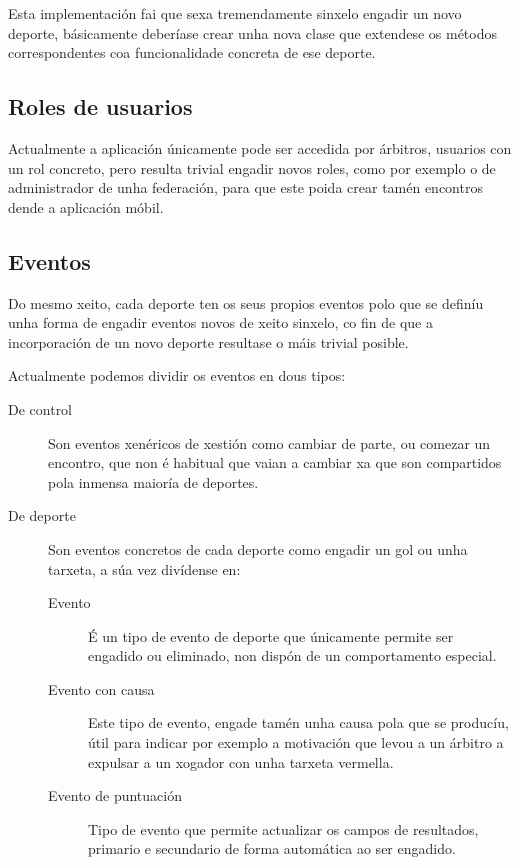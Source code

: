   Esta implementación fai que sexa tremendamente sinxelo engadir un novo 
deporte, básicamente deberíase crear unha nova clase que extendese os métodos 
correspondentes coa funcionalidade concreta de ese deporte.

  \subsection{Roles de usuarios}
  Actualmente a aplicación únicamente pode ser accedida por árbitros, usuarios 
con un rol concreto, pero resulta trivial engadir novos roles, como por exemplo 
o de administrador de unha federación, para que este poida crear tamén 
encontros dende a aplicación móbil.


  \subsection{Eventos}
  Do mesmo xeito, cada deporte ten os seus propios eventos polo que se definíu 
unha forma de engadir eventos novos de xeito sinxelo, co fin de que a 
incorporación de un novo deporte resultase o máis trivial posible.

  Actualmente podemos dividir os eventos en dous tipos:

  \begin{description}
    \item [De control] Son eventos xenéricos de xestión como cambiar de parte, 
ou comezar un encontro, que non é habitual que vaian a cambiar xa que son 
compartidos pola inmensa maioría de deportes.
    \item [De deporte] Son eventos concretos de cada deporte como engadir un gol 
ou unha tarxeta, a súa vez divídense en:
      \begin{description}
       \item [Evento] É un tipo de evento de deporte que únicamente permite ser 
engadido ou eliminado, non dispón de un comportamento especial.
       \item [Evento con causa] Este tipo de evento, engade tamén unha causa 
pola que se producíu, útil para indicar por exemplo a motivación que levou a 
un árbitro a expulsar a un xogador con unha tarxeta vermella.
         \item [Evento de puntuación] Tipo de evento que permite actualizar os 
campos de resultados, primario e secundario de forma automática ao ser engadido.
      \end{description}

  \end{description}

